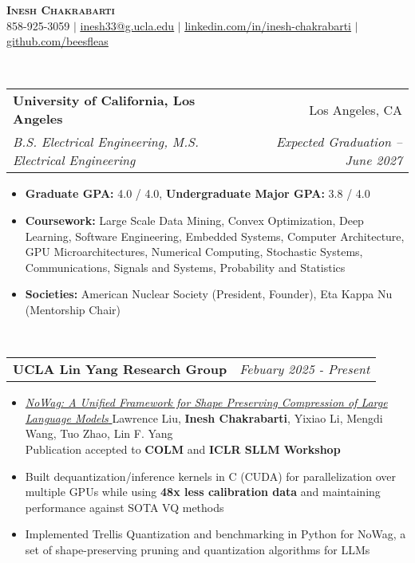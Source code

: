 \documentclass[letterpaper,11pt]{article}
\makeatletter
\newcommand{\resitem}[1]{\item #1 \vspace{-8pt}}
\newcommand{\resheading}[1]{\vspace{8pt}{\Large \textbf{#1}}\\\vspace{-8pt}\hrulefill}
\newcommand{\ressubheading}[4]{\vspace{3pt}
\begin{tabular*}{7.0in}{l@{\cftdotfill{\cftsecdotsep}\extracolsep{\fill}}r}
		\textbf{#1} & #2 \\
		\textit{#3} & \textit{#4} \\
\end{tabular*}\vspace{-6pt}}
\newcommand{\ressubheadingsmol}[2]{\vspace{1pt}
\begin{tabular*}{7.0in}{l@{\cftdotfill{\cftsecdotsep}\extracolsep{\fill}}r}
		\textbf{#1} & \textit{#2} \\
\end{tabular*}\vspace{-6pt}}
\makeatother
\begin{document}
    
\begin{center}
    \textbf{\LARGE \scshape Inesh Chakrabarti} \\ \vspace{1pt}
    \small 858-925-3059 $|$ \href{mailto:inesh33@g.ucla.edu}{\underline{inesh33@g.ucla.edu}} $|$ 
    \href{https://www.linkedin.com/in/inesh-chakrabarti-878602183}{\underline{linkedin.com/in/inesh-chakrabarti}} $|$
    \href{https://github.com/beesfleas}{\underline{github.com/beesfleas}}
\end{center}

\resheading{Education}
\ressubheading{University of California, Los Angeles}{Los Angeles, CA}{B.S. Electrical Engineering, M.S. Electrical Engineering}{Expected Graduation -- June 2027}
\begin{itemize}
	\resitem{\textbf{Graduate GPA:} 4.0 / 4.0, \textbf{Undergraduate Major GPA:} 3.8 / 4.0}
	\resitem{\textbf{Coursework:} Large Scale Data Mining, Convex Optimization, Deep Learning, Software Engineering, Embedded Systems, Computer Architecture, GPU Microarchitectures, Numerical Computing, Stochastic Systems,  Communications, Signals and Systems, Probability and Statistics}
    \resitem{\textbf{Societies:} American Nuclear Society (President, Founder), Eta Kappa Nu (Mentorship Chair)}
\end{itemize}

\resheading{Experience}
\ressubheadingsmol{UCLA Lin Yang Research Group}{Febuary 2025 - Present}{}
\begin{itemize}
  \resitem{\href{https://arxiv.org/abs/2504.14569}{\textit{NoWag: A Unified Framework for Shape Preserving Compression of Large Language Models} 
    } Lawrence Liu, \textbf{Inesh Chakrabarti}, Yixiao Li, Mengdi Wang, Tuo Zhao, Lin F. Yang \\ Publication accepted to \textbf{COLM} and \textbf{ICLR SLLM Workshop}}
    \resitem{Built dequantization/inference kernels in C (CUDA) for parallelization over multiple GPUs while using \textbf{48x less calibration data }and maintaining performance against SOTA VQ methods}
   \resitem{Implemented Trellis Quantization and benchmarking in Python for NoWag, a set of shape-preserving pruning and quantization algorithms for LLMs}
\end{itemize}
\end{document}
